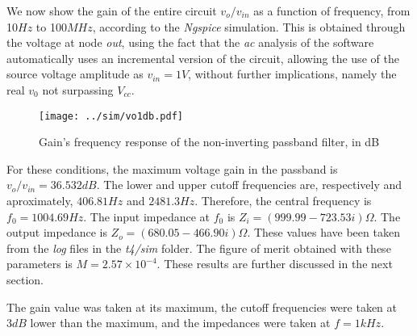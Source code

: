 \par We now show the gain of the entire circuit $v_o / v_{in}$ as a function of frequency, from 10$Hz$ to 100$MHz$, according to the \textit{Ngspice} simulation. This is obtained through the voltage at node \textit{out}, using the fact that the \textit{ac} analysis of the software automatically uses an incremental version of the circuit, allowing the use of the source voltage amplitude as $v_{in} = 1V$, without further implications, namely the real $v_0$ not surpassing $V_{cc}$.

 \vspace{-2cm}
 \begin{figure}[H]
 \centering
   \texttt{[image: ../sim/vo1db.pdf]}
   \caption{Gain's frequency response of the non-inverting passband filter, in dB}
   \label{fig:gain(freq)}
 \end{figure}

\par For these conditions, the maximum voltage gain in the passband is $v_o/v_{in} = 36.532 dB$. The lower and upper cutoff frequencies are, respectively and aproximately, $406.81 Hz$ and $2481.3 Hz$. Therefore, the central frequency is $f_0 = 1004.69 Hz$. The input impedance at $f_0$ is $Z_i = (999.99 - 723.53 i) \Omega$. The output impedance is $Z_o = (680.05 - 466.90 i) \Omega$. These values have been taken from the \textit{log} files in the \textit{t4/sim} folder. The figure of merit obtained with these parameters is $M = 2.57 \times 10^{-4}$. These results are further discussed in the next section.

\par The gain value was taken at its maximum, the cutoff frequencies were taken at $3 dB$ lower than the maximum, and the impedances were taken at $f = 1kHz$. 

